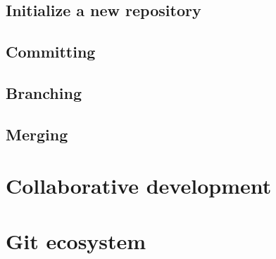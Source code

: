 \documentclass{beamer}
\begin{document}
\subsection{Initialize a new repository}

\subsection{Committing}

\subsection{Branching}

\subsection{Merging}

\section{Collaborative development}

\section{Git ecosystem}
\end{document}
